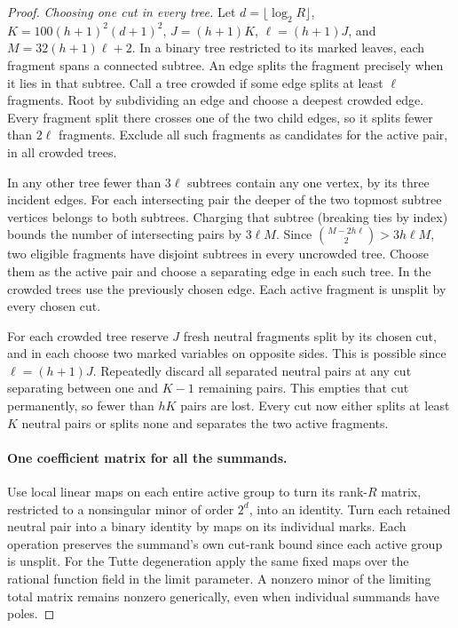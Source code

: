 \documentclass[11pt]{article}
\theoremstyle{definition}
\begin{document}
\begin{proof}
\emph{Choosing one cut in every tree.}
Let \(d=\lfloor\log_2 R\rfloor\), \(K=100(h+1)^2(d+1)^2\), \(J=(h+1)K\), \(\ell=(h+1)J\), and \(M=32(h+1)\ell+2\). In a binary tree restricted to its marked leaves, each fragment spans a connected subtree. An edge splits the fragment precisely when it lies in that subtree. Call a tree crowded if some edge splits at least \(\ell\) fragments. Root by subdividing an edge and choose a deepest crowded edge. Every fragment split there crosses one of the two child edges, so it splits fewer than \(2\ell\) fragments. Exclude all such fragments as candidates for the active pair, in all crowded trees.

In any other tree fewer than \(3\ell\) subtrees contain any one vertex, by its three incident edges. For each intersecting pair the deeper of the two topmost subtree vertices belongs to both subtrees. Charging that subtree (breaking ties by index) bounds the number of intersecting pairs by \(3\ell M\). Since \(\binom{M-2h\ell}{2}>3h\ell M\), two eligible fragments have disjoint subtrees in every uncrowded tree. Choose them as the active pair and choose a separating edge in each such tree. In the crowded trees use the previously chosen edge. Each active fragment is unsplit by every chosen cut.

For each crowded tree reserve \(J\) fresh neutral fragments split by its chosen cut, and in each choose two marked variables on opposite sides. This is possible since \(\ell=(h+1)J\). Repeatedly discard all separated neutral pairs at any cut separating between one and \(K-1\) remaining pairs. This empties that cut permanently, so fewer than \(hK\) pairs are lost. Every cut now either splits at least \(K\) neutral pairs or splits none and separates the two active fragments.

\paragraph{One coefficient matrix for all the summands.}
Use local linear maps on each entire active group to turn its rank-\(R\) matrix, restricted to a nonsingular minor of order \(2^d\), into an identity. Turn each retained neutral pair into a binary identity by maps on its individual marks. Each operation preserves the summand's own cut-rank bound since each active group is unsplit. For the Tutte degeneration apply the same fixed maps over the rational function field in the limit parameter. A nonzero minor of the limiting total matrix remains nonzero generically, even when individual summands have poles.


\end{proof}
\end{document}
